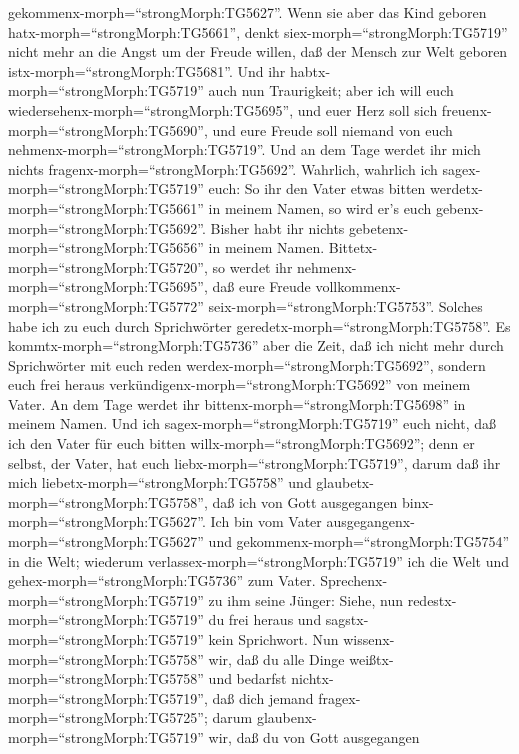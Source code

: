 gekommenx-morph=``strongMorph:TG5627''. Wenn sie aber das Kind geboren
hatx-morph=``strongMorph:TG5661'', denkt
siex-morph=``strongMorph:TG5719'' nicht mehr an die Angst um der Freude
willen, daß der Mensch zur Welt geboren
istx-morph=``strongMorph:TG5681''.  Und ihr
habtx-morph=``strongMorph:TG5719'' auch nun Traurigkeit; aber ich will
euch wiedersehenx-morph=``strongMorph:TG5695'', und euer Herz soll sich
freuenx-morph=``strongMorph:TG5690'', und eure Freude soll niemand von
euch nehmenx-morph=``strongMorph:TG5719''.  Und an dem Tage
werdet ihr mich nichts fragenx-morph=``strongMorph:TG5692''. Wahrlich,
wahrlich ich sagex-morph=``strongMorph:TG5719'' euch: So ihr den Vater
etwas bitten werdetx-morph=``strongMorph:TG5661'' in meinem Namen, so
wird er's euch gebenx-morph=``strongMorph:TG5692''.  Bisher
habt ihr nichts gebetenx-morph=``strongMorph:TG5656'' in meinem Namen.
Bittetx-morph=``strongMorph:TG5720'', so werdet ihr
nehmenx-morph=``strongMorph:TG5695'', daß eure Freude
vollkommenx-morph=``strongMorph:TG5772''
seix-morph=``strongMorph:TG5753''.  Solches habe ich zu
euch durch Sprichwörter geredetx-morph=``strongMorph:TG5758''. Es
kommtx-morph=``strongMorph:TG5736'' aber die Zeit, daß ich nicht mehr
durch Sprichwörter mit euch reden werdex-morph=``strongMorph:TG5692'',
sondern euch frei heraus verkündigenx-morph=``strongMorph:TG5692'' von
meinem Vater.  An dem Tage werdet ihr
bittenx-morph=``strongMorph:TG5698'' in meinem Namen. Und ich
sagex-morph=``strongMorph:TG5719'' euch nicht, daß ich den Vater für
euch bitten willx-morph=``strongMorph:TG5692'';  denn er
selbst, der Vater, hat euch liebx-morph=``strongMorph:TG5719'', darum
daß ihr mich liebetx-morph=``strongMorph:TG5758'' und
glaubetx-morph=``strongMorph:TG5758'', daß ich von Gott ausgegangen
binx-morph=``strongMorph:TG5627''.  Ich bin vom Vater
ausgegangenx-morph=``strongMorph:TG5627'' und
gekommenx-morph=``strongMorph:TG5754'' in die Welt; wiederum
verlassex-morph=``strongMorph:TG5719'' ich die Welt und
gehex-morph=``strongMorph:TG5736'' zum Vater. 
Sprechenx-morph=``strongMorph:TG5719'' zu ihm seine Jünger: Siehe, nun
redestx-morph=``strongMorph:TG5719'' du frei heraus und
sagstx-morph=``strongMorph:TG5719'' kein Sprichwort.  Nun
wissenx-morph=``strongMorph:TG5758'' wir, daß du alle Dinge
weißtx-morph=``strongMorph:TG5758'' und bedarfst
nichtx-morph=``strongMorph:TG5719'', daß dich jemand
fragex-morph=``strongMorph:TG5725''; darum
glaubenx-morph=``strongMorph:TG5719'' wir, daß du von Gott ausgegangen
